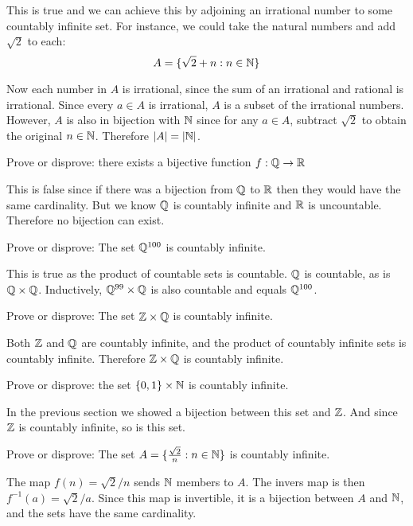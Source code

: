 \documentclass{article}
\begin{document}
This is true and we can achieve this by adjoining an irrational number to some countably infinite set. For instance, we could take the natural numbers and add $\sqrt{2}$ to each:
$$A = \{\sqrt{2} + n: n \in \mathbb{N}\}$$

Now each number in $A$ is irrational, since the sum of an irrational and rational is irrational. Since every $a \in A$ is irrational, $A$ is a subset of the irrational numbers. However, $A$ is also in bijection with $\mathbb{N}$ since for any $a \in A$, subtract $\sqrt{2}$ to obtain the original $n \in \mathbb{N}$. Therefore $|A| = |\mathbb{N}|$.

\begin{problem}
Prove or disprove: there exists a bijective function $f: \mathbb{Q} \to \mathbb{R}$
\end{problem}

This is false since if there was a bijection from $\mathbb{Q} $ to $\mathbb{R}$ then they would have the same cardinality. But we know $\mathbb{Q}$ is countably infinite and $\mathbb{R}$ is uncountable. Therefore no bijection can exist.

\begin{problem}
Prove or disprove: The set $\mathbb{Q}^{100}$ is countably infinite.
\end{problem}

This is true as the product of countable sets is countable. $\mathbb{Q}$ is countable, as is $\mathbb{Q} \times \mathbb{Q}$. Inductively, $\mathbb{Q}^{99} \times \mathbb{Q}$ is also countable and equals $\mathbb{Q}^{100}$.

\begin{problem}
Prove or disprove: The set $\mathbb{Z} \times \mathbb{Q}$ is countably infinite.
\end{problem}

Both $\mathbb{Z}$ and $\mathbb{Q}$ are countably infinite, and the product of countably infinite sets is countably infinite. Therefore $\mathbb{Z} \times \mathbb{Q}$ is countably infinite.

\begin{problem}
Prove or disprove: the set $\{0, 1\} \times \mathbb{N}$ is countably infinite.
\end{problem}

In the previous section we showed a bijection between this set and $\mathbb{Z}$. And since $\mathbb{Z}$ is countably infinite, so is this set.

\begin{problem}
Prove or disprove: The set $A = \{\frac{\sqrt{2}}{n}: n \in \mathbb{N}\}$ is countably infinite.
\end{problem}

The map $f(n) = \sqrt{2}/n$ sends $\mathbb{N}$ members to $A$. The invers map is then $f^{-1}(a) = \sqrt{2}/a$. Since this map is invertible, it is a bijection between $A$ and $\mathbb{N}$, and the sets have the same cardinality.
\end{document}
